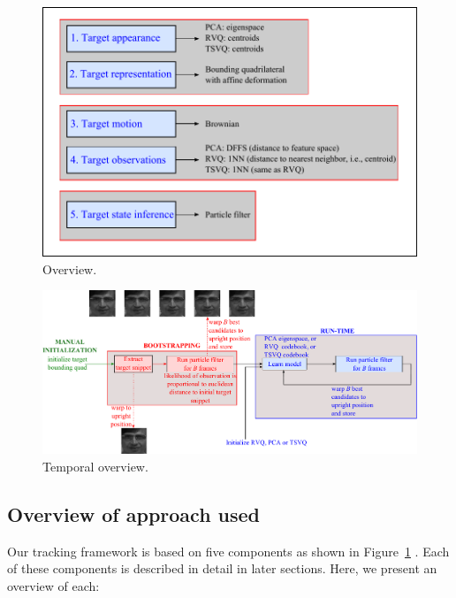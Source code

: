 								\begin{figure}[t]
								\centering
	\includegraphics[width=1.0\textwidth]{thesis/PhD_experimentalOverview.pdf}
								\caption{Overview.}
								\label{fig:overview}
								\end{figure}

								\begin{figure}[t]
								\centering
								\includegraphics[width=1\textwidth]{thesis/PhD_experimentalTemporalOverview.pdf}
								\caption{Temporal overview.}
								\label{fig:temporal_overview}
								\end{figure}
\subsection{Overview of approach used}
Our tracking framework is based on five components as shown in Figure~\ref{fig:overview} .  Each of these components is described in detail in later sections.  Here, we present an overview of each:

